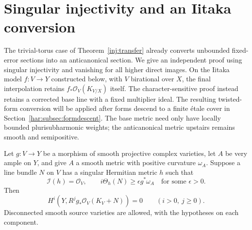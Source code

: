\section{Singular injectivity and an Iitaka conversion}
\label{inj:injectivity}

The trivial-torus case of Theorem~\ref{inj:transfer} already converts
unbounded fixed-error sections into an anticanonical section. We give an
independent proof using singular injectivity and vanishing for all higher
direct images. On the Iitaka model $f:V\to Y$ constructed below, with
$V$ birational over $X$, the final interpolation retains
$f_*\mathcal O_V(K_{V/X})$ itself. The character-sensitive proof instead retains a corrected base
line with a fixed multiplier ideal. The resulting twisted-form conversion
will be applied after forms descend to a finite étale cover in
Section~\ref{har:subsec:formdescent}. The base metric need only have locally
bounded plurisubharmonic weights; the anticanonical metric upstairs
remains smooth and semipositive.

\begin{lemma}\label{inj:leray}
Let $g:V\to Y$ be a morphism of smooth projective complex varieties, let $A$
be very ample on $Y$, and give $A$ a smooth metric with positive curvature
$\omega_A$.  Suppose a line bundle $N$ on $V$ has a singular Hermitian
metric $h$ such that
\[
 \mathcal I(h)=\mathcal O_V,
 \qquad i\Theta_h(N)\ge\epsilon g^*\omega_A
 \quad\text{for some }\epsilon>0.
\]
Then
\[
 H^i(Y,R^jg_*\mathcal O_V(K_V+N))=0
 \qquad(i>0,\ j\ge0).
\]
Disconnected smooth source varieties are allowed, with the hypotheses on
each component.
\end{lemma}

